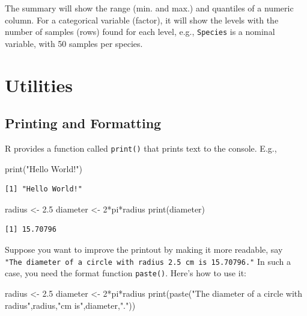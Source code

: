 \documentclass[
  letterpaper,
]{book}
\newenvironment{Shaded}{\begin{snugshade}}{\end{snugshade}}
\newcommand{\DecValTok}[1]{\textcolor[rgb]{0.68,0.00,0.00}{#1}}
\newcommand{\FloatTok}[1]{\textcolor[rgb]{0.68,0.00,0.00}{#1}}
\newcommand{\FunctionTok}[1]{\textcolor[rgb]{0.28,0.35,0.67}{#1}}
\newcommand{\NormalTok}[1]{\textcolor[rgb]{0.00,0.23,0.31}{#1}}
\newcommand{\OtherTok}[1]{\textcolor[rgb]{0.00,0.23,0.31}{#1}}
\newcommand{\SpecialCharTok}[1]{\textcolor[rgb]{0.37,0.37,0.37}{#1}}
\newcommand{\StringTok}[1]{\textcolor[rgb]{0.13,0.47,0.30}{#1}}
\begin{document}
The summary will show the range (min. and max.) and quantiles of a
numeric column. For a categorical variable (factor), it will show the
levels with the number of samples (rows) found for each level, e.g.,
\texttt{Species} is a nominal variable, with 50 samples per species.

\section*{Utilities}\label{utilities}


\subsection*{Printing and Formatting}\label{printing-and-formatting}

R provides a function called \texttt{print()} that prints text to the
console. E.g.,

\begin{Shaded}
\begin{Highlighting}[]
\FunctionTok{print}\NormalTok{(}\StringTok{"Hello World!"}\NormalTok{)}
\end{Highlighting}
\end{Shaded}

\begin{verbatim}
[1] "Hello World!"
\end{verbatim}

\begin{Shaded}
\begin{Highlighting}[]
\NormalTok{radius }\OtherTok{\textless{}{-}} \FloatTok{2.5}
\NormalTok{diameter }\OtherTok{\textless{}{-}} \DecValTok{2}\SpecialCharTok{*}\NormalTok{pi}\SpecialCharTok{*}\NormalTok{radius}
\FunctionTok{print}\NormalTok{(diameter)}
\end{Highlighting}
\end{Shaded}

\begin{verbatim}
[1] 15.70796
\end{verbatim}

Suppose you want to improve the printout by making it more readable, say
\texttt{"The\ diameter\ of\ a\ circle\ with\ radius\ 2.5\ cm\ is\ 15.70796."}
In such a case, you need the format function \texttt{paste()}. Here's
how to use it:

\begin{Shaded}
\begin{Highlighting}[]
\NormalTok{radius }\OtherTok{\textless{}{-}} \FloatTok{2.5}
\NormalTok{diameter }\OtherTok{\textless{}{-}} \DecValTok{2}\SpecialCharTok{*}\NormalTok{pi}\SpecialCharTok{*}\NormalTok{radius}
\FunctionTok{print}\NormalTok{(}\FunctionTok{paste}\NormalTok{(}\StringTok{"The diameter of a circle with radius"}\NormalTok{,radius,}\StringTok{"cm is"}\NormalTok{,diameter,}\StringTok{"."}\NormalTok{))}
\end{Highlighting}
\end{Shaded}
\end{document}
